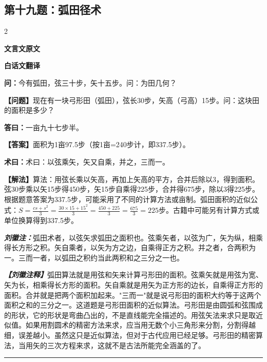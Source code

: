 \documentclass[10pt,a4paper]{article}
\newcommand{\wen}[1]{\textbf{\color{problemcolor}问：}#1\par}
\newcommand{\da}[1]{\textbf{答曰：}#1\par}
\newcommand{\shu}[1]{\textbf{术曰：}#1\par}
\newcommand{\liuhui}[1]{{\color{commentarycolor}\textit{\textbf{刘徽注：}}#1\par}}
\newcommand{\classicalheader}[1]{{\centering\large\bfseries\color{classicalcolor} #1\par\vspace{0.5em}}}
\newcommand{\wenmodern}[1]{\textbf{\color{moderncolor}【问题】}#1\par}
\newcommand{\damodern}[1]{\textbf{【答案】}#1\par}
\newcommand{\shumodern}[1]{\textbf{【解法】}#1\par}
\newcommand{\liuhuimodern}[1]{{\color{commentarycolor}\textit{\textbf{【刘徽注释】}}#1\par}}
\newcommand{\modernheader}[1]{{\centering\large\bfseries\color{moderncolor} #1\par\vspace{0.5em}}}
\newcommand{\problemsec}[1]{\subsection*{#1}}
\begin{document}
\problemsec{第十九题：弧田径术}
\begin{paracol}{2}
\classicalheader{文言文原文}
\switchcolumn
\modernheader{白话文翻译}
\switchcolumn*

\wen{今有弧田，弦三十步，矢十五步。问：为田几何？}

\switchcolumn

\wenmodern{现在有一块弓形田（弧田），弦长30步，矢高（弓高）15步。问：这块田的面积是多少？}

\switchcolumn*

\da{一亩九十七步半。}

\switchcolumn

\damodern{面积为1亩97.5步（按1亩=240步计，即337.5步）。}

\switchcolumn*

\shu{术曰：以弦乘矢，矢又自乘，并之，三而一。}

\switchcolumn

\shumodern{算法：用弦长乘以矢高，再加上矢高的平方，合并后除以3，得到面积。弦30步乘以矢15步得450步，矢15步自乘得225步，合并得675步，除以3得225步。根据题意答案为337.5步，可能采用了不同的计算方法或亩制。弧田面积的近似公式：$S=\frac{cs+s^2}{3}=\frac{30\times15+15^2}{3}=\frac{450+225}{3}=\frac{675}{3}=225$步。古籍中可能另有计算方式或单位换算得到337.5步。}

\switchcolumn*

\liuhui{弧田术者，以弦矢求弧田之面积也。弦乘矢者，以弦为广，矢为纵，相乘得长方形之积。矢自乘者，以矢为方之边，自乘得正方之积。并之者，合两积为一。三而一者，以弧田之积约当此两积和之三分之一也。}

\switchcolumn

\liuhuimodern{弧田算法就是用弦和矢来计算弓形田的面积。弦乘矢就是用弦为宽、矢为长，相乘得长方形的面积。矢自乘就是用矢为正方形的边长，自乘得正方形的面积。合并就是把两个面积加起来。"三而一"就是说弓形田的面积大约等于这两个面积之和的三分之一。这道题是弓形田面积的近似算法。弓形田是由圆弧和弦围成的形状，它的形状是弯曲凸出的，不是直线能完全描述的。用弦矢法来求只是取近似值。如果用割圆术的精密方法来求，应当用无数个小三角形来分割，分割得越细，误差越小。虽然这只是近似算法，但对于古代应用已经足够。弓形田的精密算法，当用矢的三次方程来求，这就不是古法所能完全涵盖的了。}

\end{paracol}

\vspace{0.3cm}
\hrule
\vspace{0.3cm}
\end{document}
